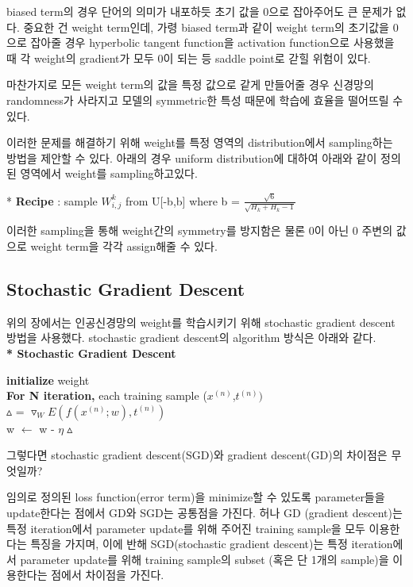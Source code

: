 \documentclass[draft=false]{oblivoir}
\begin{document}
biased term의 경우 단어의 의미가 내포하듯 초기 값을 0으로 잡아주어도 큰 문제가 없다. 중요한 건 weight term인데, 가령 biased term과 같이 weight term의 초기값을 0으로 잡아줄 경우 hyperbolic tangent function을 activation function으로 사용했을 때 각 weight의 gradient가 모두 0이 되는 등 saddle point로 갇힐 위험이 있다. 

마찬가지로 모든 weight term의 값을 특정 값으로 같게 만들어줄 경우 신경망의 randomness가 사라지고 모델의 symmetric한 특성 때문에 학습에 효율을 떨어뜨릴 수 있다. 

이러한 문제를 해결하기 위해 weight를 특정 영역의 distribution에서 sampling하는 방법을 제안할 수 있다. 아래의 경우 uniform distribution에 대하여 아래와 같이 정의된 영역에서 weight를 sampling하고있다. 
\begin{center}
* \textbf{Recipe} : sample $W^{k}_{i,j}$ from U[-b,b] where b = $\frac{\sqrt{6}}{\sqrt{H_{k}+H_{k}-1}}$\\
\end{center}
이러한 sampling을 통해 weight간의 symmetry를 방지함은 물론 0이 아닌 0 주변의 값으로 weight term을 각각 assign해줄 수 있다.
\subsection{Stochastic Gradient Descent}
위의 장에서는 인공신경망의 weight를 학습시키기 위해 stochastic gradient descent 방법을 사용했다. stochastic gradient descent의 algorithm 방식은 아래와 같다. \\


\textbf{* Stochastic Gradient Descent}
\begin{center}
\textbf{initialize} weight\\
\textbf{For N iteration,} each training sample ($x^{(n)}$,$t^{(n)})$\\
$\vartriangle$ = $\triangledown_{W}E(f(x^{(n)};w),t^{(n)})$\\
w $\leftarrow$ w - $\eta\vartriangle$
\end{center}
그렇다면 stochastic gradient descent(SGD)와 gradient descent(GD)의 차이점은 무엇일까?

임의로 정의된 loss function(error term)을 minimize할 수 있도록 parameter들을 update한다는 점에서 GD와 SGD는 공통점을 가진다. 허나 GD (gradient descent)는 특정 iteration에서 parameter update를 위해 주어진 training sample을 모두 이용한다는 특징을 가지며, 이에 반해 SGD(stochastic gradient descent)는 특정 iteration에서 parameter update를 위해 training sample의 subset (혹은 단 1개의 sample)을 이용한다는 점에서 차이점을 가진다. 
\end{document}

